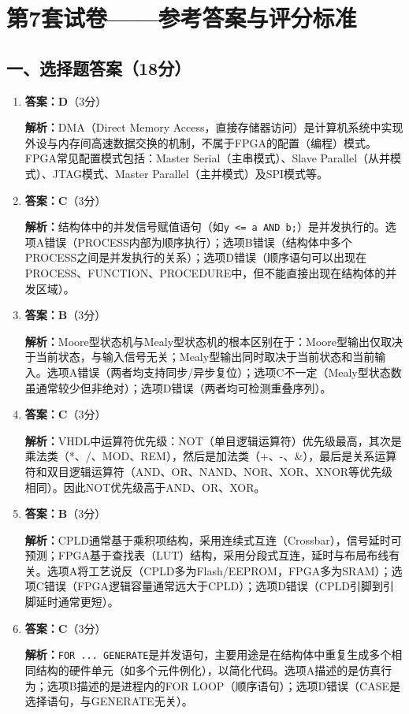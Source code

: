 \chapter{第7套试卷——参考答案与评分标准}

\section{一、选择题答案（18分）}

\begin{enumerate}[label=\arabic*., leftmargin=*]

\item \textbf{答案：D}（3分）

\textbf{解析：}DMA（Direct Memory Access，直接存储器访问）是计算机系统中实现外设与内存间高速数据交换的机制，不属于FPGA的配置（编程）模式。FPGA常见配置模式包括：Master Serial（主串模式）、Slave Parallel（从并模式）、JTAG模式、Master Parallel（主并模式）及SPI模式等。

\item \textbf{答案：C}（3分）

\textbf{解析：}结构体中的并发信号赋值语句（如\verb|y <= a AND b;|）是并发执行的。选项A错误（PROCESS内部为顺序执行）；选项B错误（结构体中多个PROCESS之间是并发执行的关系）；选项D错误（顺序语句可以出现在PROCESS、FUNCTION、PROCEDURE中，但不能直接出现在结构体的并发区域）。

\item \textbf{答案：B}（3分）

\textbf{解析：}Moore型状态机与Mealy型状态机的根本区别在于：Moore型输出仅取决于当前状态，与输入信号无关；Mealy型输出同时取决于当前状态和当前输入。选项A错误（两者均支持同步/异步复位）；选项C不一定（Mealy型状态数虽通常较少但非绝对）；选项D错误（两者均可检测重叠序列）。

\item \textbf{答案：C}（3分）

\textbf{解析：}VHDL中运算符优先级：NOT（单目逻辑运算符）优先级最高，其次是乘法类（*、/、MOD、REM），然后是加法类（+、-、\&），最后是关系运算符和双目逻辑运算符（AND、OR、NAND、NOR、XOR、XNOR等优先级相同）。因此NOT优先级高于AND、OR、XOR。

\item \textbf{答案：B}（3分）

\textbf{解析：}CPLD通常基于乘积项结构，采用连续式互连（Crossbar），信号延时可预测；FPGA基于查找表（LUT）结构，采用分段式互连，延时与布局布线有关。选项A将工艺说反（CPLD多为Flash/EEPROM，FPGA多为SRAM）；选项C错误（FPGA逻辑容量通常远大于CPLD）；选项D错误（CPLD引脚到引脚延时通常更短）。

\item \textbf{答案：C}（3分）

\textbf{解析：}\texttt{FOR ... GENERATE}是并发语句，主要用途是在结构体中重复生成多个相同结构的硬件单元（如多个元件例化），以简化代码。选项A描述的是仿真行为；选项B描述的是进程内的FOR LOOP（顺序语句）；选项D错误（CASE是选择语句，与GENERATE无关）。

\end{enumerate}

